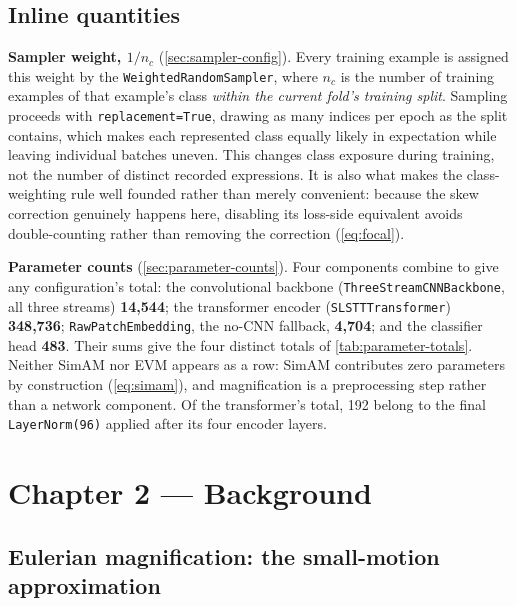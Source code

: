 \subsection{Inline quantities}
\label{eq:ch4-inline}

\textbf{Sampler weight, $1/n_c$} (\autoref{sec:sampler-config}). Every
training example is assigned this weight by the
\texttt{WeightedRandomSampler}, where $n_c$ is the number of training examples
of that example's class \emph{within the current fold's training split}.
Sampling proceeds with \texttt{replacement=True}, drawing as many indices per
epoch as the split contains, which makes each represented class equally likely
in expectation while leaving individual batches uneven. This changes class
exposure during training, not the number of distinct recorded expressions.
It is also what makes the class-weighting rule well founded rather than merely
convenient: because the skew correction genuinely happens here, disabling its
loss-side equivalent avoids double-counting rather than removing the
correction (\autoref{eq:focal}).

\textbf{Parameter counts} (\autoref{sec:parameter-counts}). Four components
combine to give any configuration's total: the convolutional backbone
(\texttt{ThreeStreamCNNBackbone}, all three streams) \textbf{14,544}; the
transformer encoder (\texttt{SLSTTTransformer}) \textbf{348,736};
\texttt{RawPatchEmbedding}, the no-CNN fallback, \textbf{4,704}; and the
classifier head \textbf{483}. Their sums give the four distinct totals of
\autoref{tab:parameter-totals}. Neither SimAM nor EVM appears as a row: SimAM
contributes zero parameters by construction (\autoref{eq:simam}), and
magnification is a preprocessing step rather than a network component. Of the
transformer's total, 192 belong to the final \texttt{LayerNorm(96)} applied
after its four encoder layers.


\section{Chapter 2 --- Background}
\label{sec:eq-ch2}

\subsection{Eulerian magnification: the small-motion approximation}
\label{eq:evm-taylor}


